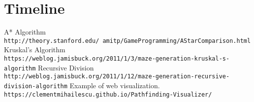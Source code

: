 \documentclass{article}
\begin{document}
\section{Timeline}
\begin{thebibliography}{9}
    A* Algorithm
    \\\texttt{http://theory.stanford.edu/~amitp/GameProgramming/AStarComparison.html}
    Kruskal's Algorithm
    \\\texttt{https://weblog.jamisbuck.org/2011/1/3/maze-generation-kruskal-s-algorithm}
    Recursive Division
    \\\texttt{http://weblog.jamisbuck.org/2011/1/12/maze-generation-recursive-division-algorithm}
    Example of web visualization.
    \\\texttt{https://clementmihailescu.github.io/Pathfinding-Visualizer/}
\end{thebibliography}
\end{document}
